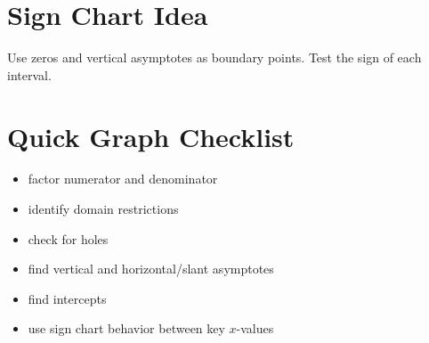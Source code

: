 \documentclass[11pt]{article}
\begin{document}
\section*{Sign Chart Idea}
Use zeros and vertical asymptotes as boundary points. Test the sign of each interval.

\section*{Quick Graph Checklist}
\begin{itemize}
  \item factor numerator and denominator
  \item identify domain restrictions
  \item check for holes
  \item find vertical and horizontal/slant asymptotes
  \item find intercepts
  \item use sign chart behavior between key $x$-values
\end{itemize}
\end{document}
